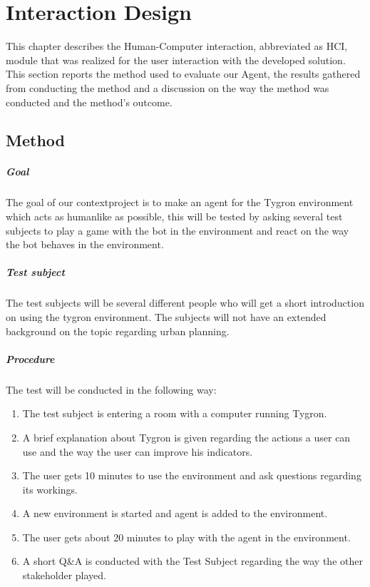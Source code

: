 \chapter{Interaction Design}
This chapter describes the Human-Computer interaction, abbreviated as HCI, module that was realized for the user interaction with the developed solution. This section reports the method used to evaluate our Agent, the results gathered from conducting the method and a discussion on the way the method was conducted and the method's outcome.

\section*{Method}

\paragraph{Goal}

The goal of our contextproject is to make an agent for the Tygron environment which acts as humanlike as possible, this will be tested by asking several test subjects to play a game with the bot in the environment and react on the way the bot behaves in the environment.

\paragraph{Test subject}

The test subjects will be several different people who will get a short introduction on using the tygron environment. The subjects will not have an extended background on the topic regarding urban planning.

\paragraph{Procedure}

The test will be conducted in the following way: 
\begin{enumerate}
\item The test subject is entering a room with a computer running Tygron.
\item A brief explanation about Tygron is given regarding the actions a user can use and the way the user can improve his indicators.
\item The user gets 10 minutes to use the environment and ask questions regarding its workings. 
\item A new environment is started and agent is added to the environment.
\item The user gets about 20 minutes to play with the agent in the environment.
\item A short Q\&A is conducted with the Test Subject regarding the way the other stakeholder played.
\end{enumerate}

